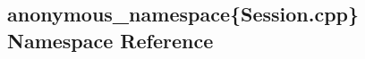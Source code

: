 \hypertarget{namespaceanonymous__namespace_02Session_8cpp_03}{}\subsection{anonymous\+\_\+namespace\{Session.\+cpp\} Namespace Reference}
\label{namespaceanonymous__namespace_02Session_8cpp_03}
